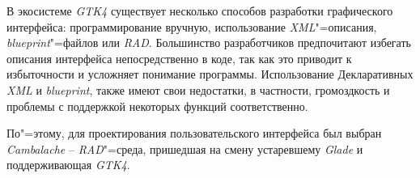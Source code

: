 В экосистеме \textit{GTK4} существует несколько способов разработки графического
интерфейса: программирование вручную, использование \textit{XML}"=описания,
\textit{blueprint}"=файлов или \textit{RAD}. Большинство разработчиков
предпочитают избегать описания интерфейса непосредственно в коде, так как это
приводит к избыточности и усложняет понимание программы. Использование
Декларативных \textit{XML} и \textit{blueprint}, также имеют свои недостатки, в
частности, громоздкость и проблемы с поддержкой некоторых функций
соответственно.

По"=этому, для проектирования пользовательского интерфейса был выбран
\textit{Cambalache} -- \textit{RAD}"=среда, пришедшая на смену устаревшему
\textit{Glade} и поддерживающая \textit{GTK4}.
